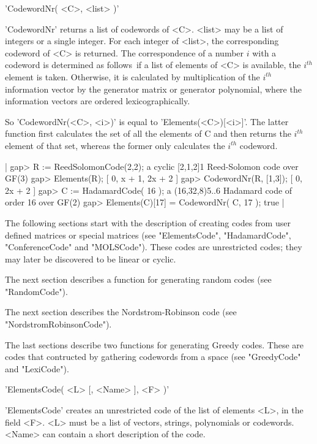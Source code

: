 'CodewordNr( <C>, <list> )'

'CodewordNr' returns a list of codewords of <C>. <list> may  be a list of
integers    or a single   integer.   For   each  integer  of  <list>, the
corresponding codeword of <C> is returned. The correspondence of a number
$i$ with a codeword is determined as follows\:\ if  a list of elements of
<C>  is  available,  the $i^{th}$ element   is  taken.  Otherwise,  it is
calculated by multiplication of   the $i^{th}$ information vector  by the
generator matrix or generator  polynomial, where the  information vectors
are ordered lexicographically.

So 'CodewordNr(<C>, <i>)' is  equal to 'Elements(<C>)[<i>]'.   The latter
function first   calculates the set  of all  the elements  of  C and then
returns the  $i^{th}$ element  of    that set, whereas the  former   only
calculates the $i^{th}$ codeword.

|    gap> R := ReedSolomonCode(2,2);
    a cyclic [2,1,2]1 Reed-Solomon code over GF(3)
    gap> Elements(R);
    [ 0, x + 1, 2x + 2 ]
    gap> CodewordNr(R, [1,3]);
    [ 0, 2x + 2 ]
    gap> C := HadamardCode( 16 );
    a (16,32,8)5..6 Hadamard code of order 16 over GF(2)
    gap> Elements(C)[17] = CodewordNr( C, 17 );
    true |


The following sections start with the description  of creating codes from
user defined   matrices   or  special   matrices  (see    "ElementsCode",
"HadamardCode",    "ConferenceCode" and   "MOLSCode").   These  codes are
unrestricted codes; they may later be discovered to be linear or cyclic.

The next section describes a  function  for generating random codes  (see
"RandomCode").

The next    section     describes the  Nordstrom-Robinson      code  (see
"NordstromRobinsonCode").

The last sections  describe  two functions  for generating Greedy  codes.
These are codes that contructed by gathering  codewords from a space (see
"GreedyCode" and "LexiCode").


'ElementsCode( <L> [, <Name> ], <F> )'

'ElementsCode' creates an unrestricted code of the  list of elements <L>,
in the field <F>.  <L> must be a list of vectors, strings, polynomials or
codewords. <Name> can contain a short description of the code.

